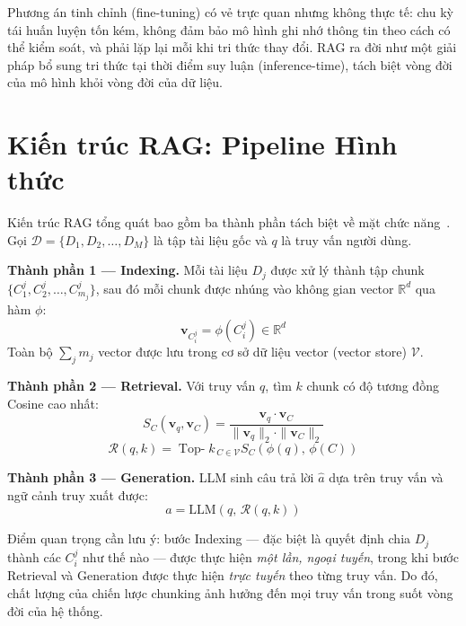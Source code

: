 \documentclass[12pt,a4paper]{report}
\theoremstyle{plain}
\theoremstyle{definition}
\begin{document}
	Phương án tinh chỉnh (fine-tuning) có vẻ trực quan nhưng không thực tế: chu
	kỳ tái huấn luyện tốn kém, không đảm bảo mô hình ghi nhớ thông tin theo cách
	có thể kiểm soát, và phải lặp lại mỗi khi tri thức thay đổi. RAG ra đời như
	một giải pháp bổ sung tri thức tại thời điểm suy luận (inference-time),
	tách biệt vòng đời của mô hình khỏi vòng đời của dữ liệu.
	
	\section{Kiến trúc RAG: Pipeline Hình thức}
	\label{sec:rag_pipeline}
	
	Kiến trúc RAG tổng quát bao gồm ba thành phần tách biệt về mặt chức
	năng~\cite{lewis2020retrieval}. Gọi $\mathcal{D} = \{D_1, D_2, \ldots,
	D_M\}$ là tập tài liệu gốc và $q$ là truy vấn người dùng.
	
	\textbf{Thành phần 1 --- Indexing.} Mỗi tài liệu $D_j$ được xử lý thành
	tập chunk $\{C_1^j, C_2^j, \ldots, C_{m_j}^j\}$, sau đó mỗi chunk được
	nhúng vào không gian vector $\mathbb{R}^d$ qua hàm $\phi$:
	\begin{equation}
		\mathbf{v}_{C_i^j} = \phi(C_i^j) \in \mathbb{R}^d
		\label{eq:indexing}
	\end{equation}
	Toàn bộ $\sum_j m_j$ vector được lưu trong cơ sở dữ liệu vector (vector
	store) $\mathcal{V}$.
	
	\textbf{Thành phần 2 --- Retrieval.} Với truy vấn $q$, tìm $k$ chunk có
	độ tương đồng Cosine cao nhất:
	\begin{equation}
		S_C(\mathbf{v}_q, \mathbf{v}_{C}) =
		\frac{\mathbf{v}_q \cdot \mathbf{v}_{C}}
		{\|\mathbf{v}_q\|_2 \cdot \|\mathbf{v}_{C}\|_2}
		\label{eq:cosine}
	\end{equation}
	\begin{equation}
		\mathcal{R}(q, k) = \operatorname{Top-}k_{\,C \in \mathcal{V}}
		S_C\!\left(\phi(q),\, \phi(C)\right)
		\label{eq:retrieval}
	\end{equation}
	
	\textbf{Thành phần 3 --- Generation.} LLM sinh câu trả lời $\hat{a}$ dựa
	trên truy vấn và ngữ cảnh truy xuất được:
	\begin{equation}
		\hat{a} = \text{LLM}\!\left(q,\, \mathcal{R}(q, k)\right)
		\label{eq:generation}
	\end{equation}
	
	Điểm quan trọng cần lưu ý: bước Indexing --- đặc biệt là quyết định chia
	$D_j$ thành các $C_i^j$ như thế nào --- được thực hiện \emph{một lần, ngoại
		tuyến}, trong khi bước Retrieval và Generation được thực hiện \emph{trực
		tuyến} theo từng truy vấn. Do đó, chất lượng của chiến lược chunking ảnh
	hưởng đến mọi truy vấn trong suốt vòng đời của hệ thống.
	
\end{document}
